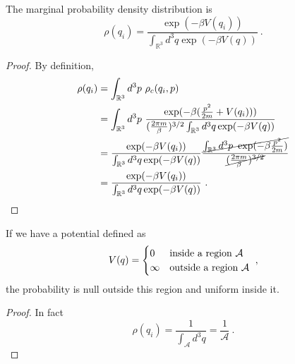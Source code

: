     The marginal probability density distribution is 
    \begin{equation*}
        \rho(q_i) = \frac{\exp (- \beta V(q_i) )}{\int_{\mathbb R^3} d^3 q \exp(- \beta V(q))} ~.
    \end{equation*}
    \begin{proof}
        By definition, 
        \begin{equation*}
        \begin{aligned}
            \rho(q_i) & = \int_{\mathbb R^3} d^3 p ~ \rho_c (q_i, p) \\ & = \int_{\mathbb R^3} d^3 p ~ \frac{\exp (- \beta ( \frac{p^2}{2m} + V(q_i) ))}{(\frac{2\pi m}{\beta})^{3/2} \int_{\mathbb R^3} d^3 q \exp(- \beta V(q))} \\ & = \frac{\exp (- \beta V(q_i) )}{\int_{\mathbb R^3} d^3 q \exp(- \beta V(q))} \frac{\cancel{\int_{\mathbb R^3} d^3 p ~ \exp(- \beta \frac{p^2}{2m})}}{\cancel{(\frac{2\pi m}{\beta})^{3/2}}} \\ & = \frac{\exp (- \beta V(q_i) )}{\int_{\mathbb R^3} d^3 q \exp(- \beta V(q))} ~.
        \end{aligned}
        \end{equation*}
    \end{proof}

    If we have a potential defined as 
    \begin{equation*}
        V (q) = \begin{cases}
            0 & \textnormal{inside a region } \mathcal A\\
            \infty & \textnormal{outside a region } \mathcal A\\
        \end{cases} ~,
    \end{equation*}
    the probability is null outside this region and uniform inside it. 
    \begin{proof}
        In fact 
        \begin{equation*}
            \rho(q_i) = \frac{1}{\int_{\mathcal A} d^3 q} = \frac{1}{\mathcal A} ~. 
        \end{equation*}
    \end{proof}

